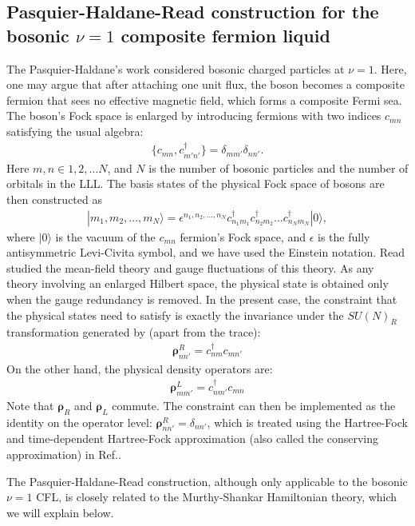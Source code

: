 \subsection{Pasquier-Haldane-Read construction for the bosonic $\nu=1$ composite fermion liquid}
The Pasquier-Haldane's work \cite{pasquier1998dipole} considered bosonic charged particles at $\nu=1$. Here, one may argue that after attaching one unit flux, the boson becomes a composite fermion that sees no effective magnetic field, which forms a composite Fermi sea. The boson's Fock space is enlarged by introducing fermions with two indices $c_{mn}$ satisfying the usual algebra:
\begin{align}
    \{c_{mn},c^\dagger_{m'n'}\}=\delta_{mm'}\delta_{nn'}.
\end{align}
Here $m,n\in 1,2,...N$, and $N$ is the number of bosonic particles and the number of orbitals in the LLL. The basis states of the physical Fock space of bosons are then constructed as
\begin{align}
    |m_1,m_2,...,m_N\rangle=\epsilon^{n_1,n_2,...,n_N} c_{n_1m_1}^\dagger c_{n_2m_2}^\dagger ... c_{n_N m_N}^\dagger|0\rangle,\label{eq:Read_projection}
\end{align}
where $|0\rangle$ is the vacuum of the $c_{mn}$ fermion's Fock space, and $\epsilon$ is the fully antisymmetric Levi-Civita symbol, and we have used the Einstein notation. Read \cite{read1998lowest} studied the mean-field theory and gauge fluctuations of this theory. As any theory involving an enlarged Hilbert space, the physical state is obtained only when the gauge redundancy is removed. In the present case, the constraint that the physical states need to satisfy is exactly the invariance under the $SU(N)_R$ transformation generated by (apart from the trace):
\begin{align}
    \pmb{\boldsymbol\rho}^R_{nn'}=c^\dagger_{nm} c_{mn'}
\end{align}
On the other hand, the physical density operators are:
\begin{align}
    \pmb{\boldsymbol\rho}^L_{mm'}=c^\dagger_{nm'} c_{mn}
\end{align}
Note that $\pmb{\boldsymbol\rho}_R$ and $\pmb{\boldsymbol\rho}_L$ commute. The constraint can then be implemented as the identity on the operator level: $\pmb{\boldsymbol\rho}^R_{nn'}=\delta_{nn'}$, which is treated using the Hartree-Fock and time-dependent Hartree-Fock approximation (also called the conserving approximation) in Ref.\cite{read1998lowest}.

The Pasquier-Haldane-Read construction, although only applicable to the bosonic $\nu=1$ CFL, is closely related to the Murthy-Shankar Hamiltonian theory, which we will explain below.

